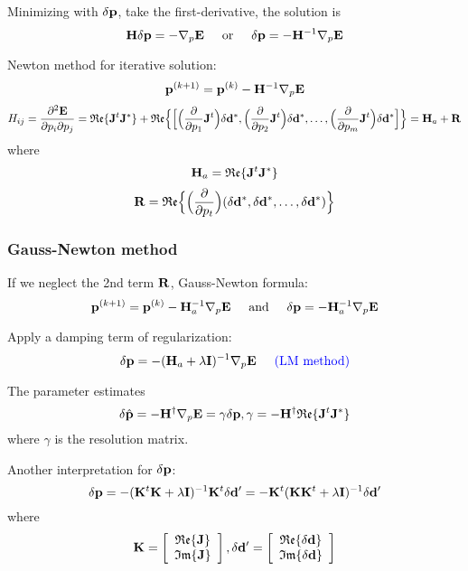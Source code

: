 Minimizing with $\delta\mathbf{p}$, take the first-derivative, the solution is
\[ \mathbf{H}\delta\mathbf{p}=-\nabla_p\mathbf{E} \text{\hspace{5mm}or\hspace{5mm}} \delta\mathbf{p}=-\mathbf{H}^{-1}\nabla_p\mathbf{E} \]

Newton method for iterative solution:
\[ \mathbf{p}^{(k+1)}=\mathbf{p}^{(k)}-\mathbf{H}^{-1}\nabla_p\mathbf{E} \]
\[ H_{ij}=\frac{\partial^2\mathbf{E}}{\partial p_i\partial p_j}=\mathfrak{Re}\{\mathbf{J}^t\mathbf{J}^*\}+\mathfrak{Re}\Big\{\Big[\Big(\frac{\partial}{\partial p_1}\mathbf{J}^t\Big)\delta\mathbf{d}^*,\Big(\frac{\partial}{\partial p_2}\mathbf{J}^t\Big)\delta\mathbf{d}^*,\ldots,\Big(\frac{\partial}{\partial p_m}\mathbf{J}^t\Big)\delta\mathbf{d}^*\Big]\Big\}=\mathbf{H}_a+\mathbf{R} \]
where
\[ \mathbf{H}_a=\mathfrak{Re}\{\mathbf{J}^t\mathbf{J}^*\} \]
\[ \mathbf{R}=\mathfrak{Re}\Big\{\Big(\frac{\partial}{\partial p_t}\Big)(\delta\mathbf{d}^*,\delta\mathbf{d}^*,\ldots,\delta\mathbf{d}^*)\Big\} \]

\subsubsection{Gauss-Newton method}
If we neglect the 2nd term $\mathbf{R}$, Gauss-Newton formula:
\[ \mathbf{p}^{(k+1)}=\mathbf{p}^{(k)}-\mathbf{H}_a^{-1}\nabla_p\mathbf{E} \text{\hspace{5mm}and\hspace{5mm}} \delta\mathbf{p}=-\mathbf{H}_a^{-1}\nabla_p\mathbf{E} \]

Apply a damping term of regularization:
\[ \delta\mathbf{p}=-(\mathbf{H}_a+\lambda\mathbf{I})^{-1}\nabla_p\mathbf{E} \text{\hspace{5mm}{\color{blue}(LM method)}}\]

The parameter estimates
\[ \delta\hat{\mathbf{p}}=-\mathbf{H}^\dagger\nabla_p\mathbf{E}=\gamma\delta\mathbf{p},\gamma=-\mathbf{H}^\dagger\mathfrak{Re}\{\mathbf{J}^t\mathbf{J}^*\} \]
where $\gamma$ is the resolution matrix.

Another interpretation for $\delta\mathbf{p}$:
\[ \delta\mathbf{p}=-(\mathbf{K}^t\mathbf{K}+\lambda\mathbf{I})^{-1}\mathbf{K}^t\delta\mathbf{d}^\prime=-\mathbf{K}^t(\mathbf{K}\mathbf{K}^t+\lambda\mathbf{I})^{-1}\delta\mathbf{d}^\prime \]
where
\begin{equation*}
  \mathbf{K}=\left[ \begin{array}{c}
    \mathfrak{Re}\{\mathbf{J}\} \\
    \mathfrak{Im}\{\mathbf{J}\}
  \end{array}\right],
  \delta\mathbf{d}^\prime=\left[ \begin{array}{c}
    \mathfrak{Re}\{\delta\mathbf{d}\} \\
    \mathfrak{Im}\{\delta\mathbf{d}\}
  \end{array}\right]
\end{equation*}

